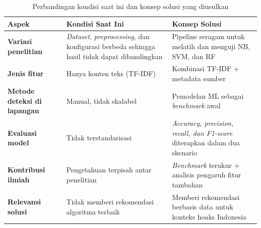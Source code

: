 \begin{table}[h!]
\centering
\begin{tabular}{| p{} | p{} | p{} |}
\hline
\textbf{Aspek} 
& \textbf{Kondisi Saat Ini} 
& \textbf{Konsep Solusi} \\
\hline

\textbf{Variasi penelitian} 
& \textit{Dataset}, \textit{preprocessing}, dan konfigurasi berbeda sehingga hasil tidak dapat dibandingkan 
& Pipeline seragam untuk melatih dan menguji NB, SVM, dan RF \\
\hline

\textbf{Jenis fitur} 
& Hanya konten teks (TF-IDF) 
& Kombinasi TF-IDF + metadata sumber \\
\hline

\textbf{Metode deteksi di lapangan} 
& Manual, tidak skalabel 
& Pemodelan ML sebagai \textit{benchmark} awal \\
\hline

\textbf{Evaluasi model} 
& Tidak terstandarisasi 
& \textit{Accuracy, precision, recall, dan F1-score} diterapkan dalam dua skenario \\
\hline

\textbf{Kontribusi ilmiah} 
& Pengetahuan terpisah antar penelitian 
& \textit{Benchmark} terukur + analisis pengaruh fitur tambahan \\
\hline

\textbf{Relevansi solusi} 
& Tidak memberi rekomendasi algoritma terbaik 
& Memberi rekomendasi berbasis data untuk konteks hoaks Indonesia \\
\hline

\end{tabular}
\caption{Perbandingan kondisi saat ini dan konsep solusi yang diusulkan}
\label{tbl:perbandingan-kondisi-solusi}
\end{table}

